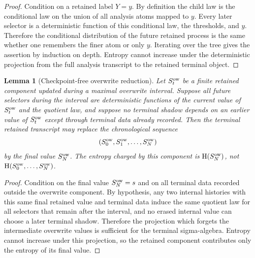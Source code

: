 \documentclass[11pt]{article}
\newtheorem{lemma}[theorem]{Lemma}
\theoremstyle{remark}
\newcommand{\HH}{\mathrm H}
\begin{document}
\begin{proof}
Condition on a retained label $Y=y$.  By definition the child law is the conditional law on the union of all analysis atoms mapped to $y$.  Every later selector is a deterministic function of this conditional law, the thresholds, and $y$.  Therefore the conditional distribution of the future retained process is the same whether one remembers the finer atom or only $y$.  Iterating over the tree gives the assertion by induction on depth.  Entropy cannot increase under the deterministic projection from the full analysis transcript to the retained terminal object.
\end{proof}

\begin{lemma}[Checkpoint-free overwrite reduction]\label{lem:app-overwrite}
Let $S_t^{\rm ow}$ be a finite retained component updated during a maximal overwrite interval.  Suppose all future selectors during the interval are deterministic functions of the current value of $S_t^{\rm ow}$ and the quotient law, and suppose no terminal shadow depends on an earlier value of $S_t^{\rm ow}$ except through terminal data already recorded.  Then the terminal retained transcript may replace the chronological sequence
\[
        (S_0^{\rm ow},S_1^{\rm ow},\ldots,S_N^{\rm ow})
\]
by the final value $S_N^{\rm ow}$.  The entropy charged by this component is $\HH(S_N^{\rm ow})$, not $\HH(S_0^{\rm ow},\ldots,S_N^{\rm ow})$.
\end{lemma}

\begin{proof}
Condition on the final value $S_N^{\rm ow}=s$ and on all terminal data recorded outside the overwrite component.  By hypothesis, any two internal histories with this same final retained value and terminal data induce the same quotient law for all selectors that remain after the interval, and no erased internal value can choose a later terminal shadow.  Therefore the projection which forgets the intermediate overwrite values is sufficient for the terminal sigma-algebra.  Entropy cannot increase under this projection, so the retained component contributes only the entropy of its final value.
\end{proof}
\end{document}
